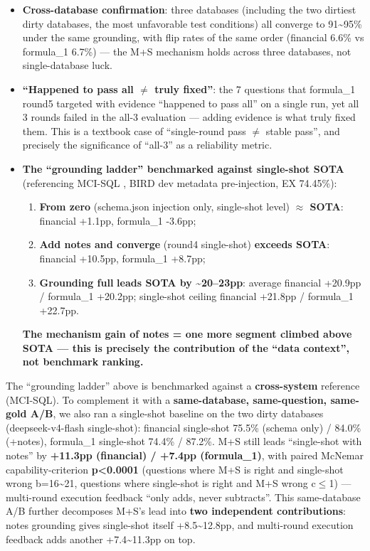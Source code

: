 \documentclass[11pt]{article}
\begin{document}
\begin{itemize}
\item
  \textbf{Cross-database confirmation}: three databases (including the two dirtiest dirty databases, the most unfavorable test conditions) all converge to 91\textasciitilde95\% under the same grounding, with flip rates of the same order (financial 6.6\% vs formula\_1 6.7\%) --- the M+S mechanism holds across three databases, not single-database luck.
\item
  \textbf{``Happened to pass all $\neq$ truly fixed''}: the 7 questions that formula\_1 round5 targeted with evidence ``happened to pass all'' on a single run, yet all 3 rounds failed in the all-3 evaluation --- adding evidence is what truly fixed them. This is a textbook case of ``single-round pass $\neq$ stable pass'', and precisely the significance of ``all-3'' as a reliability metric.
\item
  \textbf{The ``grounding ladder'' benchmarked against single-shot SOTA} (referencing MCI-SQL \cite{mcisql}, BIRD dev metadata pre-injection, EX 74.45\%):

  \begin{enumerate}
  \def\labelenumi{\arabic{enumi}.}
  \item
    \textbf{From zero} (schema.json injection only, single-shot level) \textbf{$\approx$ SOTA}: financial +1.1pp, formula\_1 -3.6pp;
  \item
    \textbf{Add notes and converge} (round4 single-shot) \textbf{exceeds SOTA}: financial +10.5pp, formula\_1 +8.7pp;
  \item
    \textbf{Grounding full} \textbf{leads SOTA by \textasciitilde20--23pp}: average financial +20.9pp / formula\_1 +20.2pp; single-shot ceiling financial +21.8pp / formula\_1 +22.7pp.
  \end{enumerate}

  \textbf{The mechanism gain of notes = one more segment climbed above SOTA --- this is precisely the contribution of the ``data context'', not benchmark ranking.}
\end{itemize}

The ``grounding ladder'' above is benchmarked against a \textbf{cross-system} reference (MCI-SQL). To complement it with a \textbf{same-database, same-question, same-gold A/B}, we also ran a single-shot baseline on the two dirty databases (deepseek-v4-flash single-shot): financial single-shot 75.5\% (schema only) / 84.0\% (+notes), formula\_1 single-shot 74.4\% / 87.2\%. M+S still leads ``single-shot with notes'' by \textbf{+11.3pp (financial) / +7.4pp (formula\_1)}, with paired McNemar capability-criterion \textbf{p\textless0.0001} (questions where M+S is right and single-shot wrong b=16\textasciitilde21, questions where single-shot is right and M+S wrong c$\leq$1) --- multi-round execution feedback ``only adds, never subtracts''. This same-database A/B further decomposes M+S's lead into \textbf{two independent contributions}: notes grounding gives single-shot itself +8.5\textasciitilde12.8pp, and multi-round execution feedback adds another +7.4\textasciitilde11.3pp on top.
\end{document}
